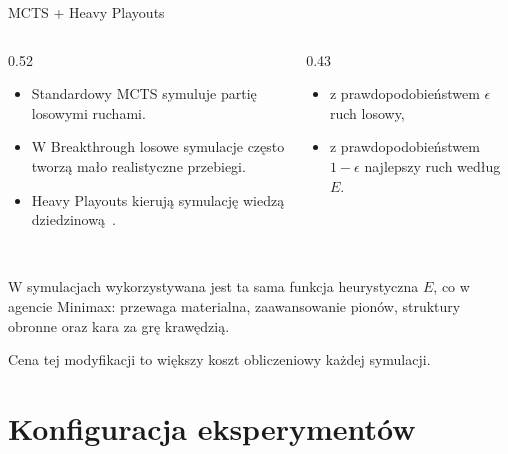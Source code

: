 \documentclass[10pt, aspectratio=169]{beamer}
\begin{document}
\begin{frame}{MCTS + Heavy Playouts}
    \begin{columns}[T]
    \begin{column}{0.52\textwidth}
        \vspace{0.1cm}
        \begin{itemize}
            \item Standardowy MCTS symuluje partię losowymi ruchami.
            \item W Breakthrough losowe symulacje często tworzą mało realistyczne przebiegi.
            \item Heavy Playouts kierują symulację wiedzą dziedzinową~\cite{browne2012survey}.
        \end{itemize}
    \end{column}

    \begin{column}{0.43\textwidth}
        ~\cite{sutton2018reinforcement}
        \vspace{0.1cm}
        \begin{itemize}
            \item z prawdopodobieństwem $\epsilon$ ruch losowy,
            \item z prawdopodobieństwem $1-\epsilon$ najlepszy ruch według $E$.
        \end{itemize}
    \end{column}
    \end{columns}

    \vspace{0.45cm}

     \\
    W symulacjach wykorzystywana jest ta sama funkcja heurystyczna $E$, co w agencie Minimax: przewaga materialna, zaawansowanie pionów, struktury obronne oraz kara za grę krawędzią.

    \vspace{0.25cm}
    \small
    Cena tej modyfikacji to większy koszt obliczeniowy każdej symulacji.
\end{frame}

\section{Konfiguracja eksperymentów}
\end{document}
